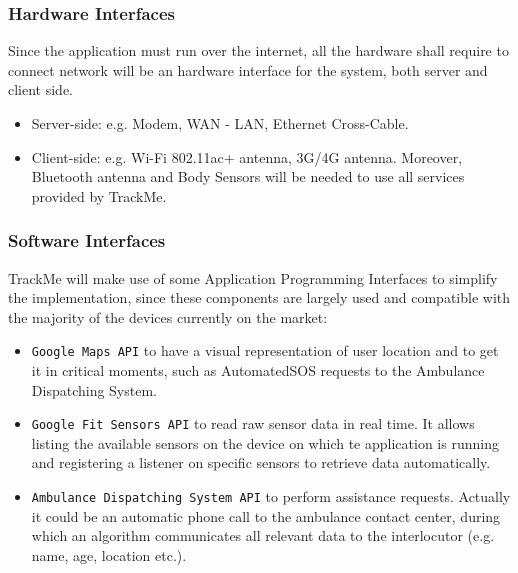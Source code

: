 \documentclass[12pt,a4paper]{article}
\begin{document}
	\newpage
	\subsubsection{Hardware Interfaces}
		Since the application must run over the internet, all the hardware shall require to connect network will be an hardware interface for the system, both server and client side.
		\begin{itemize}
			\item Server-side: e.g. Modem, WAN - LAN, Ethernet Cross-Cable.
			\item Client-side: e.g. Wi-Fi 802.11ac+ antenna, 3G/4G antenna. Moreover, Bluetooth antenna and Body Sensors will be needed to use all services provided by TrackMe. 
		\end{itemize}
	\subsubsection{Software Interfaces}
		TrackMe will make use of some Application Programming Interfaces to simplify the implementation, since these components are largely used and compatible with the majority of the devices currently on the market:
		\begin{itemize}
			\item \texttt{Google Maps API} to have a visual representation of user location and to get it in critical moments, such as AutomatedSOS requests to the Ambulance Dispatching System.
			\item \texttt{Google Fit Sensors API} to read raw sensor data in real time. It allows listing the available sensors on the device on which te application is running and registering a listener on specific sensors to retrieve data automatically.
			\item \texttt{Ambulance Dispatching System API} to perform assistance requests. Actually it could be an automatic phone call to the ambulance contact center, during which an algorithm communicates all relevant data to the interlocutor (e.g. name, age, location etc.).
		\end{itemize}
\end{document}

